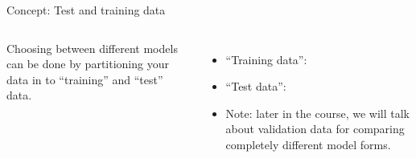 \documentclass[aspectratio=169]{beamer}
\begin{document}
\begin{frame}{Concept:  Test and training data}


\begin{columns}


Choosing between different models can be done by partitioning your data in to ``training'' and ``test'' data.

\begin{itemize}
\item ``Training data'': 

\hspace{5mm}

\item ``Test data'': 

\hspace{5mm}

\item<3-> Note: later in the course, we will talk about validation data for comparing completely different model forms.

\end{itemize}

\end{columns}


\end{frame}
\end{document}
